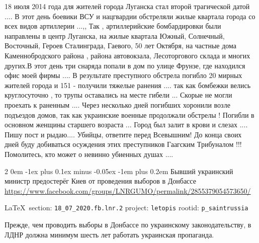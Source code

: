 \documentclass[a4paper,11pt]{extreport}
\makeatletter
\renewcommand\subsection{%
  \clearpage
    \@startsection{subsection}%
    {2}%
    {0em}%
    {-1ex plus 0.1ex minus -0.05ex}%
    {-1em plus 0.2em}%
    {\scshape\bfseries\Large}%
}
\makeatother
\begin{document}
18 июля 2014 года для жителей города Луганска стал второй трагической датой
.... В этот день боевики ВСУ и нацгвардии обстреляли жилые квартала города со
всех видов артиллерии ...,, Так , артиллерийские бомбардировки были направлены
в центр Луганска, на жилые квартала Южный, Солнечный, Восточный, Героев
Сталинграда, Гаевого, 50 лет Октября, на частные дома Каменнобродского района ,
района автовокзала, Лесоторгового склада и многих других.В этот день три
снаряда попали в дом по улице Фрунзе, где находился офис моей фирмы .... В
результате преступного обстрела погибло 20 мирных жителей города и 151 -
получили тяжелые ранения .... так как бомбежки велись круглосуточно , то трупы
оставались на месте гибели ... Скорые не могли проехать к раненным .... Через
несколько дней погибших хоронили возле подъездов домов, так как украинские
военные продолжали обстрелы ! Погибли в основном женщины старшего возраста ...
Город был залит в крови и слезах .... Пишу пост и рыдаю.... Убийцы, ответите
перед Всевышним! До конца своих дней буду добиваться осуждения этих
преступников Гаагским Трибуналом !!! Помолитесь, кто может о невинно убиенных
душах ....
  
 
 
\subsection{Бывший украинский министр предостерёг Киев от проведения выборов в Донбассе}
\label{sec:18_07_2020.fb.lnr.2}
\url{https://www.facebook.com/groups/LNRGUMO/permalink/2855379054573650/}
  
\vspace{0.5cm}
{\small\LaTeX~section: \verb|18_07_2020.fb.lnr.2| project: \verb|letopis| rootid: \verb|p_saintrussia|}
\vspace{0.5cm}

Прежде, чем проводить выборы в Донбассе по украинскому законодательству, в ЛДНР
должна минимум шесть лет работать украинская пропаганда. 
  
 
 
\end{document}
